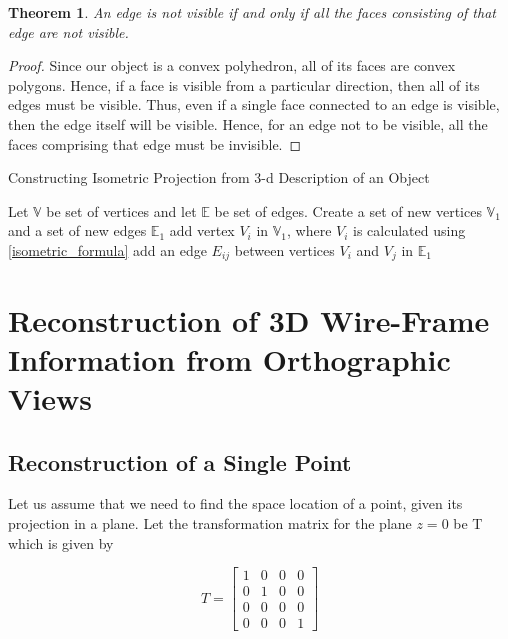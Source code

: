 \documentclass[12pt]{article}
\newtheorem{theorem}{Theorem}
\begin{document}
\begin{theorem}
An edge is not visible if and only if all the faces consisting of that edge are not visible.
\end{theorem}
\begin{proof}
    Since our object is a convex polyhedron, all of its faces are convex polygons. Hence, if a face is visible from a particular direction, then all of its edges must be visible. Thus, even if a single face connected to an edge is visible, then the edge itself will be visible. Hence, for an edge not to be visible, all the faces comprising that edge must be invisible.
\end{proof}

\begin{algorithm}
	\caption{Constructing Isometric Projection from 3-d Description of an Object}
	\begin{algorithmic}
	    \STATE Let $\mathbb{V}$ be set of vertices and let $\mathbb{E}$ be set of edges.
	    \STATE Create a set of new vertices $ \mathbb{V}_1 $ and a set of new edges $ \mathbb{E}_1$
	         \STATE add vertex $V_{i}$ in $\mathbb{V}_1$, where $V_{i}$ is calculated using \eqref{isometric_formula}
        \ENDFOR
            \STATE add an edge $E_{ij}$ between vertices $V_{i}$ and $V_{j}$ in $ \mathbb{E}_1 $
        \ENDFOR
	\end{algorithmic}
\end{algorithm}

\section{Reconstruction of 3D Wire-Frame Information from Orthographic Views}

\subsection{Reconstruction of a Single Point}

Let us assume that we need to find the space location of a point, given its projection in a plane. Let the transformation matrix for the plane $z=0$ be T which is given by
	
		\[
			T = 
			\begin{bmatrix}
				1 & 0 & 0 & 0\\
				0 & 1 & 0 & 0\\
				0 & 0 & 0 & 0\\
				0 & 0 & 0 & 1
			\end{bmatrix}				
		\]
\end{document}
